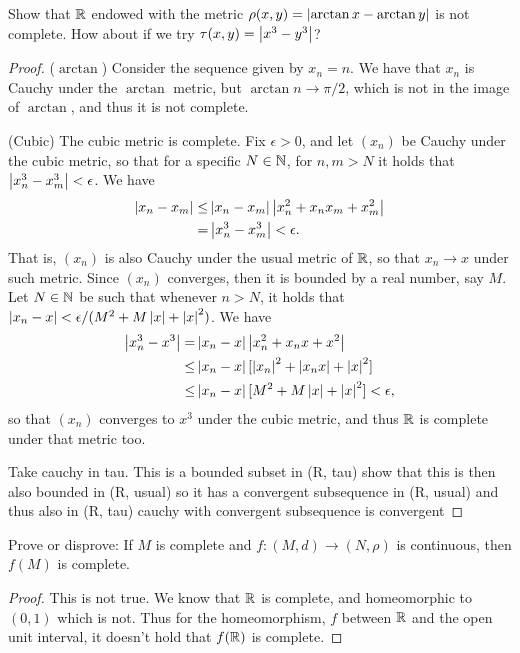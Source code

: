 \begin{exercise}{13}
Show that $\mathbb{R}$ endowed with the metric $\rho(x,y)=\left\lvert \arctan x-\arctan y\right\rvert$ is not complete.
How about if we try $\tau(x,y)=\left\lvert x^3-y^3\right\rvert$?
\end{exercise}
\begin{proof}
($\arctan$)
Consider the sequence given by $x_n = n$.
We have that $x_n$ is Cauchy under the $\arctan$ metric, but $\arctan n\to \pi/2$, which is not in the image of $\arctan$, and thus it is not complete.

(Cubic)
The cubic metric is complete.
Fix $\epsilon>0$, and let $(x_n)$ be Cauchy under the cubic metric, so that for a specific $N\in\mathbb{N}$, for $n,m>N$ it holds that $\left\lvert x_n^3 - x_m^3\right\rvert<\epsilon$.
We have
\begin{align*}
    \left\lvert x_n-x_m\right\rvert
    \leq& \left\lvert x_n-x_m\right\rvert\left\lvert x_n^2+x_nx_m+x_m^2\right\rvert\\
    =& \left\lvert x_n^3-x_m^3\right\rvert
    < \epsilon.
\end{align*}
That is, $(x_n)$ is also Cauchy under the usual metric of $\mathbb{R}$, so that $x_n\to x$ under such metric.
Since $(x_n)$ converges, then it is bounded by a real number, say $M$.
Let $N\in\mathbb{N}$ be such that whenever $n>N$, it holds that $\left\lvert x_n-x\right\rvert<\epsilon/(M^2+M\left\lvert x\right\rvert+\left\lvert x\right\rvert^2)$.
We have
\begin{align*}
    \left\lvert x_n^3-x^3\right\rvert
    =& \left\lvert x_n-x\right\rvert\left\lvert x_n^2+x_nx+x^2\right\rvert\\
    \leq& \left\lvert x_n-x\right\rvert[\left\lvert x_n\right\rvert^2 + \left\lvert x_n x\right\rvert + \left\lvert x\right\rvert^2]\\
    \leq& \left\lvert x_n-x\right\rvert[M^2 + M\left\lvert x\right\rvert +\left\lvert x\right\rvert^2]
    < \epsilon,
\end{align*}
so that $(x_n)$ converges to $x^3$ under the cubic metric, and thus $\mathbb{R}$ is complete under that metric too.

Take cauchy in tau. This is a bounded subset in (R, tau)
show that this is then also bounded in (R, usual)
so it has a convergent subsequence in (R, usual) and thus also in (R, tau) 
cauchy with convergent subsequence is convergent
\end{proof} 

\begin{exercise}{15}
Prove or disprove:
If $M$ is complete and $f:(M,d)\to (N,\rho)$ is continuous, then $f(M)$ is complete.
\end{exercise}
\begin{proof}
This is not true.
We know that $\mathbb{R}$ is complete, and homeomorphic to $(0,1)$ which is not.
Thus for the homeomorphism, $f$ between $\mathbb{R}$ and the open unit interval, it doesn't hold that $f(\mathbb{R})$ is complete.
\end{proof} 

